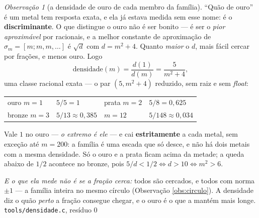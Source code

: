 \documentclass[11pt]{article}
\newcommand{\code}[1]{\texttt{\small #1}}
\theoremstyle{plain}
\theoremstyle{remark}
\newtheorem{obs}{Observação}
\begin{document}
\begin{obs}[a densidade de ouro de cada membro da família]\label{obs:densidade}
``Quão de ouro'' é um metal tem resposta exata, e ela já estava medida sem esse nome: é o
\textbf{discriminante}. O que distingue o ouro não é ser bonito --- é ser o \emph{pior
aproximável} por racionais, e a melhor constante de aproximação de $\sigma_m=[m;m,m,\dots]$ é
$\sqrt{d}$ com $d=m^2+4$. Quanto \emph{maior} o $d$, mais fácil cercar por frações, e menos ouro.
Logo
\[
 \text{densidade}(m)=\frac{d(1)}{d(m)}=\frac{5}{m^2+4},
\]
uma classe racional exata --- o par $(5,m^2+4)$ reduzido, sem raiz e sem \emph{float}:
\begin{center}
\begin{tabular}{llll}
\toprule
ouro $m=1$ & $5/5=1$ & prata $m=2$ & $5/8=0{,}625$\\
bronze $m=3$ & $5/13\approx0{,}385$ & $m=12$ & $5/148\approx0{,}034$\\
\bottomrule
\end{tabular}
\end{center}
Vale $1$ no ouro --- \emph{o extremo é ele} --- e cai \textbf{estritamente} a cada metal, sem
exceção até $m=200$: a família é uma escada que só desce, e não há dois metais com a mesma
densidade. Só o ouro e a prata ficam acima da metade; a queda abaixo de $1/2$ acontece no bronze,
pois $5/d<1/2\iff d>10\iff m^2>6$.

\emph{E o que ela mede não é se a fração cerca:} todos são cercados, e todos com norma $\pm1$
--- a família inteira no mesmo círculo (Observação \ref{obs:circulo}). A densidade diz o quão
\emph{perto} a fração consegue chegar, e o ouro é o que a mantém mais longe.
\hfill{\small\code{tools/densidade.c}, resíduo $0$}
\end{obs}
\end{document}
